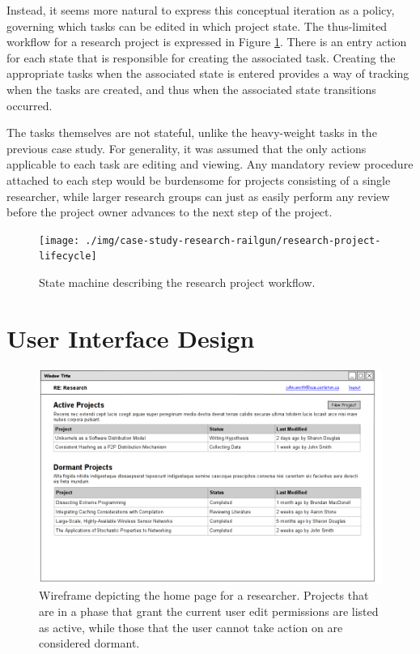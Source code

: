 Instead, it seems more natural to express this conceptual iteration as a policy, governing which tasks can be edited in which project state. The thus-limited workflow for a research project is expressed in Figure \ref{fig:case-research-design-project-workflow}. There is an entry action for each state that is responsible for creating the associated task. Creating the appropriate tasks when the associated state is entered provides a way of tracking when the tasks are created, and thus when the associated state transitions occurred.

The tasks themselves are not stateful, unlike the heavy-weight tasks in the previous case study. For generality, it was assumed that the only actions applicable to each task are editing and viewing. Any mandatory review procedure attached to each step would be burdensome for projects consisting of a single researcher, while larger research groups can just as easily perform any review before the project owner advances to the next step of the project.

\begin{figure}[!ht]
\centering \texttt{[image: ./img/case-study-research-railgun/research-project-lifecycle]}
\caption{State machine describing the research project workflow.}
\label{fig:case-research-design-project-workflow}
\end{figure}

\FloatBarrier

\section {User Interface Design}

\begin{figure}[!ht]
\centering \includegraphics[width=5.5in]{./img/case-study-research-railgun/mockup-home-page}
\caption{Wireframe depicting the home page for a researcher. Projects that are in a phase that grant the current user edit permissions are listed as active, while those that the user cannot take action on are considered dormant.}
\label{fig:case-research-design-view-analysis}
\end{figure}

